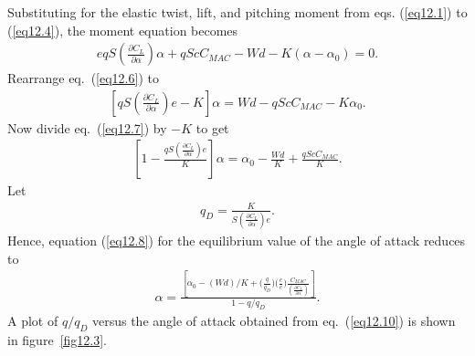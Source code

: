 \documentclass{AeroStructure-ERJohnson}
\begin{document}
Substituting for the elastic twist, lift, and pitching moment from eqs. (\ref{eq12.1}) to (\ref{eq12.4}), the moment equation becomes
\begin{align}\label{eq12.6}
e q S\left(\frac{\partial C_{L}}{\partial \alpha}\right) \alpha+q S c C_{M A C}-W d-K\left(\alpha-\alpha_{0}\right)=0.
\end{align}
Rearrange eq.~(\ref{eq12.6}) to
\begin{align}\label{eq12.7}
\left[q S\left(\frac{\partial C_{L}}{\partial \alpha}\right) e-K\right] \alpha=W d-q S c C_{M A C}-K \alpha_{0}.
\end{align}
Now divide eq.~(\ref{eq12.7}) by $-K$ to get
\begin{align}\label{eq12.8}
\left[1-\frac{q S\left(\frac{\partial C_{L}}{\partial \alpha}\right) e}{K}\right] \alpha=\alpha_{0}-\frac{W d}{K}+\frac{q S c C_{M A C}}{K}.
\end{align}
Let
\begin{align}\label{eq12.9}
q_{D}=\frac{K}{S\left(\frac{\partial C_{L}}{\partial \alpha}\right) e}.
\end{align}
Hence, equation (\ref{eq12.8}) for the equilibrium value of the angle of attack reduces to
\begin{align}\label{eq12.10}
\alpha=\frac{\left[\alpha_{0}-(W d) / K+\Big(\frac{q}{q_{D}}\Big)\big(\frac{c}{e}\big) \frac{C_{M A C}}{\left(\frac{\partial C_{L}}{\partial \alpha}\right)}\right]}{1-q / q_{D}}.
\end{align}
A plot of $q / q_{D}$ versus the angle of attack obtained from eq.~(\ref{eq12.10}) is shown in figure~\ref{fig12.3}\vadjust{\vspace*{8pt}\pagebreak}.

{\def\thefigure{12.3}
}
\end{document}
